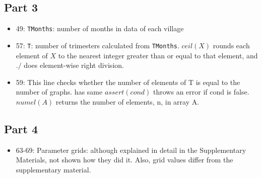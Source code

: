 \documentclass[10pt,letterpaper]{article}
\begin{document}
\subsection*{Part 3}
\begin{itemize}
  \item 49: \texttt{TMonths}: number of months in data of each village
  \item 57: \texttt{T}: number of trimesters calculated from \texttt{TMonths}. $ceil(X)$ rounds each element of $X$ to the nearest integer greater than or equal to that element, and $./$ does element-wise right division.
  \item 59: This line checks whether the number of elements of T is equal to the number of graphs. has same $assert(cond)$ throws an error if cond is false. $numel(A)$ returns the number of elements, n, in array A.
\end{itemize}

\subsection*{Part 4}
\begin{itemize}
  \item 63-69: Parameter grids: although explained in detail in the Supplementary Materials, not shown how they did it. 
    Also, grid values differ from the supplementary material.
\end{itemize} 
\end{document}

